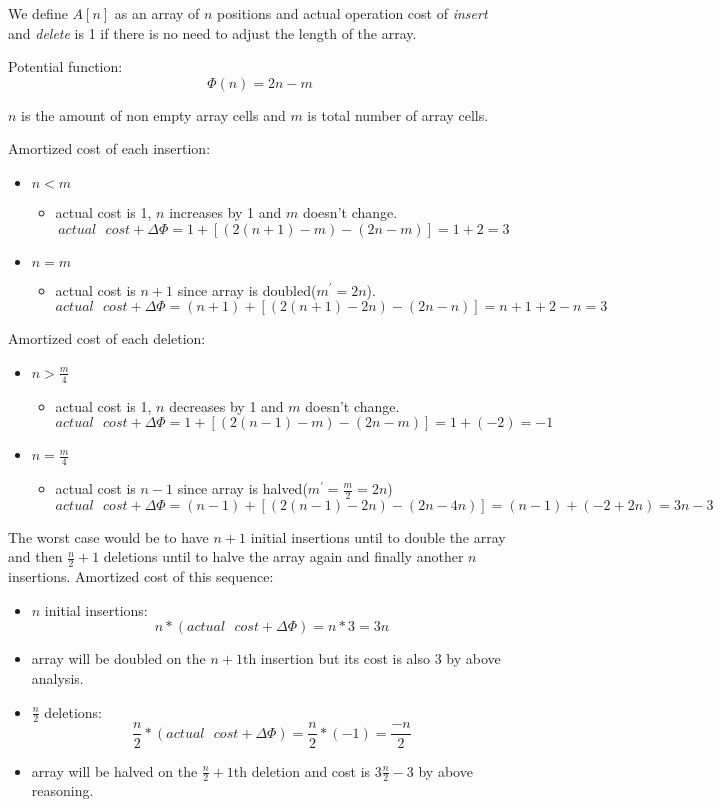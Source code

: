 We define $A[n]$ as an array of $n$ positions and actual operation cost of \textit{insert} and \textit{delete} is 1 if there is no need to adjust the length of the array.

Potential function:
$$
\Phi(n) = 2n - m
$$

$n$ is the amount of non empty array cells and $m$ is total number of array cells.

Amortized cost of each insertion:
\begin{itemize}
\item $n < m$
\begin{itemize}
\item actual cost is 1, $n$ increases by 1 and $m$ doesn't change.
$$
actual\text{ }cost + \Delta\Phi = 1 + [(2(n+1)-m) - (2n-m)] = 1 + 2 = 3
$$
\end{itemize}

\item $n = m$
\begin{itemize}
\item actual cost is $n + 1$ since array is doubled($m^{'} = 2n$).
$$
actual\text{ }cost + \Delta\Phi = (n+1) + [(2(n+1)-2n) - (2n - n)] = n+1 + 2-n = 3
$$
\end{itemize}
\end{itemize}

Amortized cost of each deletion:
\begin{itemize}
\item $n > \frac{m}{4}$
\begin{itemize}
\item actual cost is 1, $n$ decreases by 1 and $m$ doesn't change.
$$
actual\text{ }cost + \Delta\Phi = 1 + [(2(n-1)-m) - (2n-m)] = 1 + (-2) = -1
$$
\end{itemize}

\item $n = \frac{m}{4}$
\begin{itemize}
\item actual cost is $n-1$ since array is halved($m^{'} = \frac{m}{2} = 2n$)
$$
actual\text{ }cost + \Delta\Phi = (n-1) + [(2(n-1)-2n) - (2n-4n)] = (n-1) + (-2+2n) = 3n - 3
$$
\end{itemize}
\end{itemize}

The worst case would be to have $n + 1$ initial insertions until to double the array and then $\frac{n}{2} + 1$ deletions until to halve the array again and finally another $n$ insertions. Amortized cost of this sequence:
\begin{itemize}
\item $n$ initial insertions:
$$
n * (actual\text{ }cost + \Delta\Phi) = n * 3 = 3n
$$
\item array will be doubled on the $n+1$th insertion but its cost is also 3 by above analysis.
\item $\frac{n}{2}$ deletions:
$$
\frac{n}{2} * (actual\textit{ }cost + \Delta\Phi) = \frac{n}{2} * (-1) = \frac{-n}{2}
$$
\item array will be halved on the $\frac{n}{2} + 1$th deletion and cost is $3\frac{n}{2}-3$ by above reasoning.
\end{itemize}

